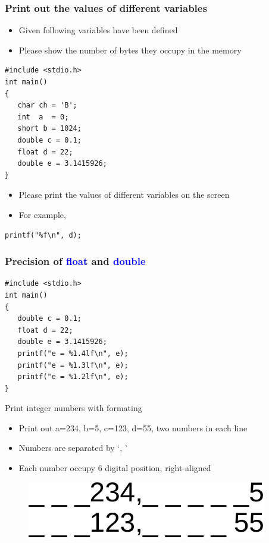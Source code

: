 \begin{frame}[fragile]
\frametitle{Print out the values of different variables}
\vspace{-0.1in}
\begin{itemize}
	\item {Given following variables have been defined}
	\item {Please show the number of bytes they occupy in the memory}
\end{itemize}
\begin{lstlisting}[xleftmargin=0.08\linewidth, linewidth=0.96\linewidth]
#include <stdio.h>
int main()
{
   char ch = 'B';
   int  a  = 0;
   short b = 1024;
   double c = 0.1;
   float d = 22;
   double e = 3.1415926;
}
\end{lstlisting}
\vspace{-0.2in}
\begin{itemize}
	\item {Please print the values of different variables on the screen}
	\item {For example,}
\end{itemize}
\begin{lstlisting}[xleftmargin=0.08\linewidth, linewidth=0.96\linewidth]
   printf("%f\n", d);
\end{lstlisting}
\end{frame}

\begin{frame}[fragile]
\frametitle{Precision of \textcolor{blue}{float} and \textcolor{blue}{double}}
\vspace{-0.1in}
\begin{lstlisting}[xleftmargin=0.08\linewidth, linewidth=0.96\linewidth]
#include <stdio.h>
int main()
{
   double c = 0.1;
   float d = 22;
   double e = 3.1415926;
   printf("e = %1.4lf\n", e);
   printf("e = %1.3lf\n", e);
   printf("e = %1.2lf\n", e);
}
\end{lstlisting}
\end{frame}

\begin{frame}[fragile]{Print integer numbers with formating}
\begin{itemize}
	\item {Print out a=234, b=5, c=123, d=55, two numbers in each line}
	\item {Numbers are separated by `, '}
	\item {Each number occupy 6 digital position, right-aligned}
\end{itemize}
\begin{figure}
	\centering
	\includegraphics[width=0.5\linewidth]{figs/format.pdf}
\end{figure}
\end{frame}


